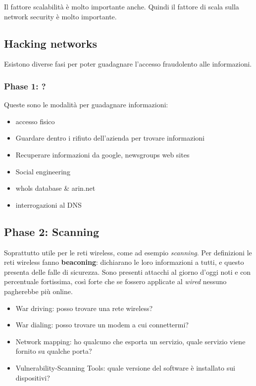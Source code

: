 Il fattore scalabilità è molto importante anche. Quindi il fattore di scala 
sulla network security è molto importante.

\subsection{Hacking networks}

Esistono diverse fasi per poter guadagnare l'accesso fraudolento alle 
informazioni.

\subsubsection{Phase 1: ?}

Queste sono le modalità per guadagnare informazioni:
\begin{itemize}
 \item accesso fisico
 \item Guardare dentro i rifiuto dell'azienda per trovare informazioni
 \item Recuperare informazioni da google, newsgroups web sites
 \item Social engineering
 \item whols database \& arin.net
 \item interrogazioni al DNS
\end{itemize}

\subsection{Phase 2: Scanning}

Soprattutto utile per le reti wireless, come ad esempio \textit{scanning}. Per 
definizioni le reti wireless fanno \textbf{beaconing}: dichiarano le loro 
informazioni a tutti, e questo presenta delle falle di sicurezza. Sono presenti 
attacchi al giorno d'oggi noti e con percentuale fortissima, così forte che se 
fossero applicate al \textit{wired} nessuno pagherebbe più online.

\begin{itemize}
\item War driving: posso trovare una rete wireless?
\item War dialing: posso trovare un modem a cui connettermi?
\item Network mapping: ho qualcuno che esporta un servizio, quale servizio 
viene fornito su qualche porta?
\item Vulnerability-Scanning Tools: quale versione del software è installato 
sui dispositivi?
\end{itemize}

